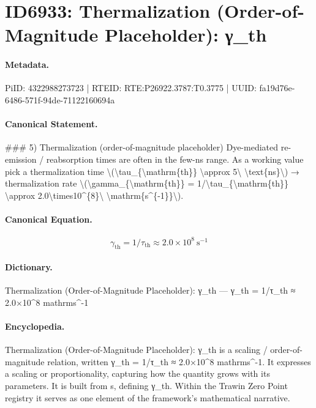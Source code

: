 \section*{ID6933: Thermalization (Order-of-Magnitude Placeholder): γ\_th}
\paragraph{Metadata.}
PiID: 4322988273723 | RTEID: RTE:P26922.3787:T0.3775 | UUID: fa19d76e-6486-571f-94de-71122160694a

\paragraph{Canonical Statement.}
\#\#\# 5) Thermalization (order-of-magnitude placeholder) Dye-mediated re-emission / reabsorption times are often in the few-ns range. As a working value pick a thermalization time \textbackslash{}(\textbackslash{}tau\_\{\textbackslash{}mathrm\{th\}\} \textbackslash{}approx 5\textbackslash{} \textbackslash{}text\{ns\}\textbackslash{}) → thermalization rate \textbackslash{}(\textbackslash{}gamma\_\{\textbackslash{}mathrm\{th\}\} = 1/\textbackslash{}tau\_\{\textbackslash{}mathrm\{th\}\} \textbackslash{}approx 2.0\textbackslash{}times10\textasciicircum{}\{8\}\textbackslash{} \textbackslash{}mathrm\{s\textasciicircum{}\{-1\}\}\textbackslash{}).

\paragraph{Canonical Equation.}
\[
\gamma_{\mathrm{th}} = 1/\tau_{\mathrm{th}} \approx 2.0\times10^{8}\ \mathrm{s^{-1}}
\]

\paragraph{Dictionary.}
Thermalization (Order-of-Magnitude Placeholder): γ\_th — γ\_th = 1/τ\_th ≈ 2.0×10\textasciicircum{}8 mathrms\textasciicircum{}-1

\paragraph{Encyclopedia.}
Thermalization (Order-of-Magnitude Placeholder): γ\_th is a scaling / order-of-magnitude relation, written γ\_th = 1/τ\_th ≈ 2.0×10\textasciicircum{}8 mathrms\textasciicircum{}-1. It expresses a scaling or proportionality, capturing how the quantity grows with its parameters. It is built from s, defining γ\_th. Within the Trawin Zero Point registry it serves as one element of the framework's mathematical narrative.
